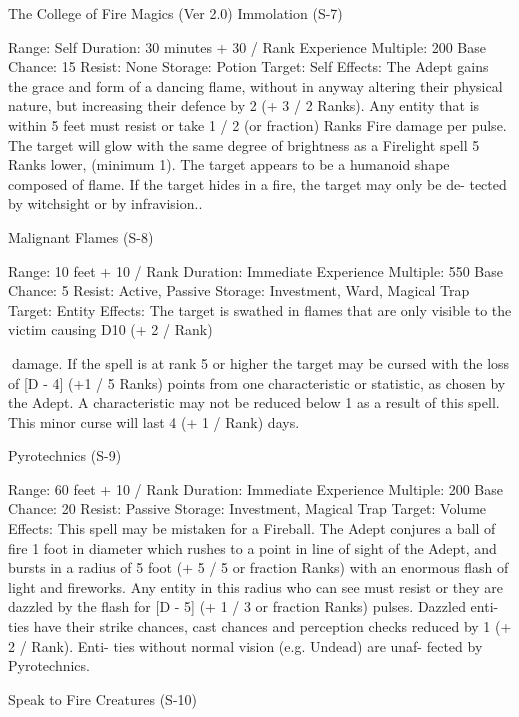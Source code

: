 \begin{Chapter}{The College of Fire Magics (Ver 2.0)}
Immolation (S-7) 

Range: Self 
Duration: 30 minutes + 30 / Rank 
Experience Multiple: 200 
Base Chance: 15%
Resist: None 
Storage: Potion 
Target: Self 
Effects:  The  Adept  gains  the  grace  and  form  of  a 
dancing  flame,  without  in  anyway  altering  their 
physical  nature,  but  increasing  their  defence  by  2 
(+  3  /  2  Ranks).  Any  entity  that  is  within  5  feet 
must  resist  or  take  1  /  2  (or  fraction)  Ranks  Fire 
damage  per  pulse.  The  target  will  glow  with  the 
same  degree  of  brightness  as  a  Firelight  spell  5 
Ranks  lower,  (minimum  1).  The  target  appears  to 
be  a  humanoid  shape  composed  of  flame.  If  the 
target  hides  in  a  fire,  the  target  may  only  be  de-
tected by witchsight or by infravision.. 

Malignant Flames (S-8) 

Range: 10 feet + 10 / Rank 
Duration: Immediate 
Experience Multiple: 550 
Base Chance: 5%
Resist: Active, Passive 
Storage: Investment, Ward, Magical Trap 
Target: Entity 
Effects:  The  target  is  swathed  in  flames  that  are 
only visible to the victim causing D10 (+ 2 / Rank) 

damage. If the spell is at rank 5 or higher the target 
may  be  cursed  with  the  loss  of  [D  -  4]  (+1  /  5 
Ranks)  points  from  one  characteristic  or  statistic, 
as  chosen  by  the  Adept.  A  characteristic  may  not 
be  reduced  below  1  as  a  result  of  this  spell.  This 
minor curse will last 4 (+ 1 / Rank) days. 

Pyrotechnics (S-9) 

Range: 60 feet + 10 / Rank 
Duration: Immediate 
Experience Multiple: 200 
Base Chance: 20%
Resist: Passive 
Storage: Investment, Magical Trap 
Target: Volume 
Effects:  This  spell  may  be  mistaken for  a  Fireball. 
The Adept conjures a ball of fire 1 foot in diameter 
which  rushes  to  a  point  in  line  of  sight  of  the 
Adept,  and  bursts in a  radius  of  5  foot  (+  5  /  5  or 
fraction Ranks) with an enormous flash of light and 
fireworks.  Any  entity  in  this  radius  who  can  see 
must resist or they are dazzled by the flash for [D - 
5] (+ 1 / 3 or fraction Ranks) pulses. Dazzled enti-
ties  have  their  strike  chances,  cast  chances  and 
perception checks reduced by 1 (+ 2 / Rank). Enti-
ties  without normal  vision  (e.g.  Undead)  are  unaf-
fected by Pyrotechnics. 

Speak to Fire Creatures (S-10) 


\end{Chapter}
